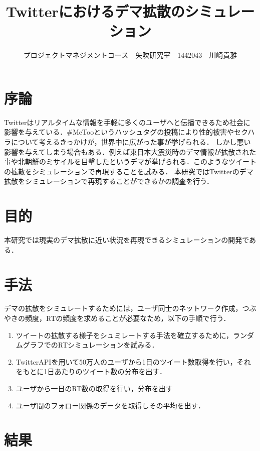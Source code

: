 \documentclass[uplatex,twocolumn,dvipdfmx]{jsarticle}
\title{\vspace{-5mm}\fontsize{14pt}{0pt}\selectfont Twitterにおけるデマ拡散のシミュレーション}
\author{\normalsize プロジェクトマネジメントコース　矢吹研究室　1442043　川崎貴雅}
\date{}
\begin{document}
\fontsize{10.5pt}{\baselineskip}\selectfont
\maketitle



\section{序論}\label{序論}

Twitterはリアルタイムな情報を手軽に多くのユーザへと伝播できるため社会に影響を与えている．\#MeTooというハッシュタグの投稿により性的被害やセクハラについて考えるきっかけが，世界中に広がった事が挙げられる．
しかし悪い影響を与えてしまう場合もある．例えば東日本大震災時のデマ情報が拡散された事や北朝鮮のミサイルを目撃したというデマが挙げられる．このようなツイートの拡散をシミュレーションで再現することを試みる．
本研究ではTwitterのデマ拡散をシミュレーションで再現することができるかの調査を行う．

\section{目的}

本研究では現実のデマ拡散に近い状況を再現できるシミュレーションの開発である．

\section{手法}

デマの拡散をシミュレートするためには，ユーザ同士のネットワーク作成，つぶやきの頻度，RTの頻度を求めることが必要なため，以下の手順で行う．
\begin{enumerate}
\item ツイートの拡散する様子をシュミレートする手法を確立するために，ランダムグラフでのRTシミュレーションを試みる\cite{netto}．
\item TwitterAPIを用いて50万人のユーザから1日のツイート数取得を行い，それをもとに1日あたりのツイート数の分布を出す．
\item ユーザから一日のRT数の取得を行い，分布を出す
\item ユーザ間のフォロー関係のデータを取得しその平均を出す．
\end{enumerate}

\section{結果}
\end{document}
